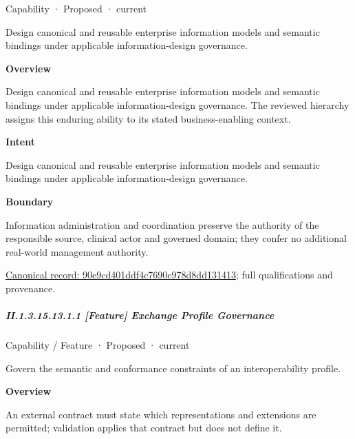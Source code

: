 \label{element:90e9cd401ddf4c7690c978d8dd131413}
{\small Capability · Proposed · current}\par

Design canonical and reusable enterprise information models and semantic bindings under applicable information-design governance.



\textbf{Overview}



Design canonical and reusable enterprise information models and semantic bindings under applicable information-design governance. The reviewed hierarchy assigns this enduring ability to its stated business-enabling context.



\textbf{Intent}



Design canonical and reusable enterprise information models and semantic bindings under applicable information-design governance.



\textbf{Boundary}



Information administration and coordination preserve the authority of the responsible source, clinical actor and governed domain; they confer no additional real-world management authority.


{\footnotesize \href{../../../../continuum/strategy/capability/90e9cd401ddf4c7690c978d8dd131413.md}{Canonical record: 90e9cd401ddf4c7690c978d8dd131413}; full qualifications and provenance.}\par
\subparagraph*{II.1.3.15.13.1.1 [Feature] Exchange Profile Governance}
\label{navigation:II.1.3.15.13.1.1}

\label{element:5e59d8f2e23e4fb5b59a5bd1dd3f31fa}
{\small Capability / Feature · Proposed · current}\par

Govern the semantic and conformance constraints of an interoperability profile.



\textbf{Overview}



An external contract must state which representations and extensions are permitted; validation applies that contract but does not define it.



